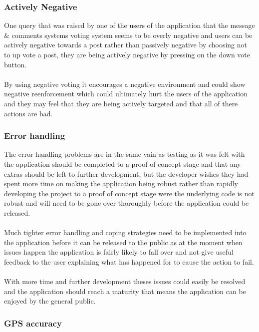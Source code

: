 \subsubsection{Actively Negative}

One query that was raised by one of the users of the application that the message \& comments systems voting system seems to be overly negative and users can be actively negative towards a post rather than passively negative by choosing not to up vote a post, they are being actively negative by pressing on the down vote button.\\
\\
By using negative voting it encourages a negative environment and could show negative reenforcement which could ultimately hurt the users of the application and they may feel that they are being actively targeted and that all of there actions are bad.

\subsubsection{Error handling}

The error handling problems are in the same vain as testing as it was felt with the application should be completed to a proof of concept stage and that any extras should be left to further development, but the developer wishes they had spent more time on making the application being robust rather than rapidly developing the project to a proof of concept stage were the underlying code is not robust and will need to be gone over thoroughly before the application could be released.\\
\\
Much tighter error handling and coping strategies need to be implemented into the application before it can be released to the public as at the moment when issues happen the application is fairly likely to fall over and not give useful feedback to the user explaining what has happened for to cause the action to fail.\\
\\
With more time and further development theses issues could easily be resolved and the application should reach a maturity that means the application can be enjoyed by the general public.

\subsubsection{GPS accuracy}


